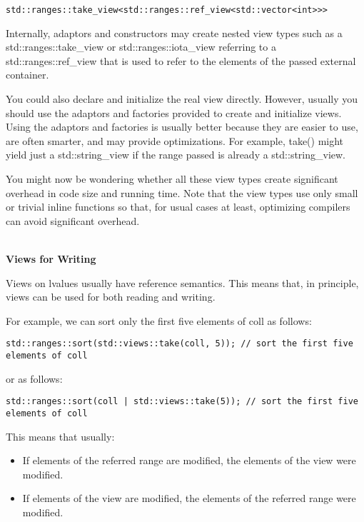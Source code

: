 \begin{lstlisting}[style=styleCXX]
std::ranges::take_view<std::ranges::ref_view<std::vector<int>>>
\end{lstlisting}

Internally, adaptors and constructors may create nested view types such as a std::ranges::take\_view or std::ranges::iota\_view referring to a std::ranges::ref\_view that is used to refer to the elements of the passed external container.

You could also declare and initialize the real view directly. However, usually you should use the adaptors and factories provided to create and initialize views. Using the adaptors and factories is usually better because they are easier to use, are often smarter, and may provide optimizations. For example, take() might yield just a std::string\_view if the range passed is already a std::string\_view.

You might now be wondering whether all these view types create significant overhead in code size and running time. Note that the view types use only small or trivial inline functions so that, for usual cases at least, optimizing compilers can avoid significant overhead.

\noindent
\hspace*{\fill} \\ %
\textbf{Views for Writing}

Views on lvalues usually have reference semantics. This means that, in principle, views can be used for both reading and writing.

For example, we can sort only the first five elements of coll as follows:

\begin{lstlisting}[style=styleCXX]
std::ranges::sort(std::views::take(coll, 5)); // sort the first five elements of coll
\end{lstlisting}

or as follows:

\begin{lstlisting}[style=styleCXX]
std::ranges::sort(coll | std::views::take(5)); // sort the first five elements of coll
\end{lstlisting}

This means that usually:

\begin{itemize}
\item
If elements of the referred range are modified, the elements of the view were modified.

\item
If elements of the view are modified, the elements of the referred range were modified.
\end{itemize}

